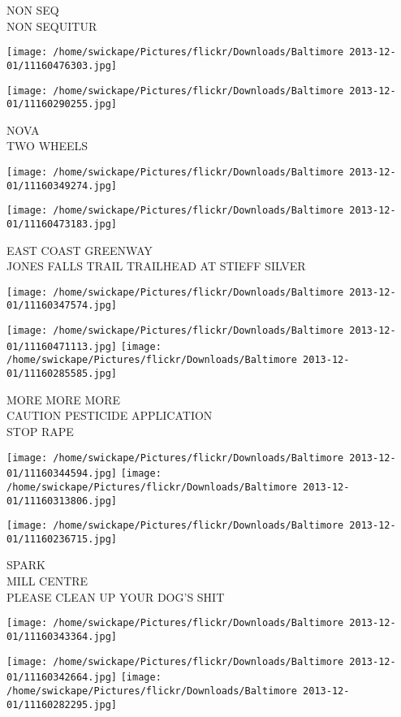 \documentclass[10pt,letterpaper]{article}
\begin{document}
NON SEQ\\
NON SEQUITUR
\pagebreak

\texttt{[image: /home/swickape/Pictures/flickr/Downloads/Baltimore 2013-12-01/11160476303.jpg]}

\vspace{0.25in}
\texttt{[image: /home/swickape/Pictures/flickr/Downloads/Baltimore 2013-12-01/11160290255.jpg]}

NOVA\\
TWO WHEELS
\pagebreak

\texttt{[image: /home/swickape/Pictures/flickr/Downloads/Baltimore 2013-12-01/11160349274.jpg]}

\vspace{0.25in}
\texttt{[image: /home/swickape/Pictures/flickr/Downloads/Baltimore 2013-12-01/11160473183.jpg]}

EAST COAST GREENWAY\\
JONES FALLS TRAIL TRAILHEAD AT STIEFF SILVER
\pagebreak

\texttt{[image: /home/swickape/Pictures/flickr/Downloads/Baltimore 2013-12-01/11160347574.jpg]}

\vspace{0.25in}
\texttt{[image: /home/swickape/Pictures/flickr/Downloads/Baltimore 2013-12-01/11160471113.jpg]}
\texttt{[image: /home/swickape/Pictures/flickr/Downloads/Baltimore 2013-12-01/11160285585.jpg]}

MORE MORE MORE\\
CAUTION PESTICIDE APPLICATION\\
STOP RAPE
\pagebreak

\texttt{[image: /home/swickape/Pictures/flickr/Downloads/Baltimore 2013-12-01/11160344594.jpg]}
\texttt{[image: /home/swickape/Pictures/flickr/Downloads/Baltimore 2013-12-01/11160313806.jpg]}

\texttt{[image: /home/swickape/Pictures/flickr/Downloads/Baltimore 2013-12-01/11160236715.jpg]}

SPARK\\
MILL CENTRE\\
PLEASE CLEAN UP YOUR DOG'S SHIT
\pagebreak

\texttt{[image: /home/swickape/Pictures/flickr/Downloads/Baltimore 2013-12-01/11160343364.jpg]}

\vspace{0.25in}
\texttt{[image: /home/swickape/Pictures/flickr/Downloads/Baltimore 2013-12-01/11160342664.jpg]}
\texttt{[image: /home/swickape/Pictures/flickr/Downloads/Baltimore 2013-12-01/11160282295.jpg]}
\end{document}
